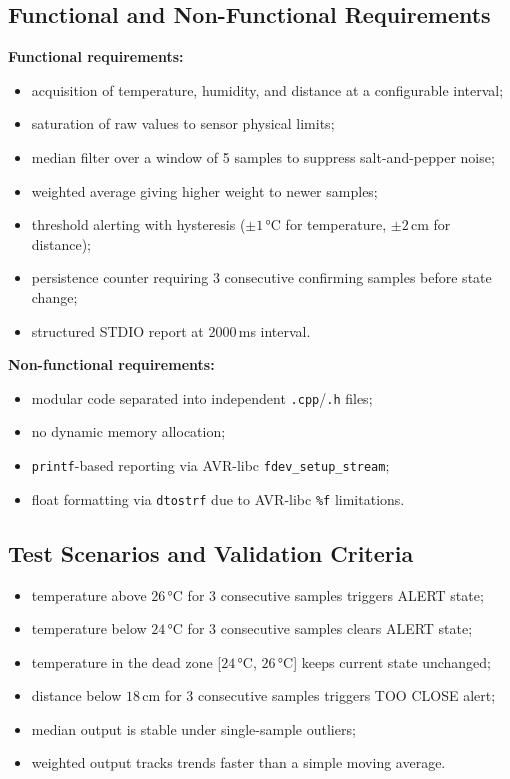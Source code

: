 \documentclass[12pt,a4paper]{article}
\begin{document}
\subsection{Functional and Non-Functional Requirements}

\textbf{Functional requirements:}
\begin{itemize}
    \item acquisition of temperature, humidity, and distance at a configurable interval;
    \item saturation of raw values to sensor physical limits;
    \item median filter over a window of 5 samples to suppress salt-and-pepper noise;
    \item weighted average giving higher weight to newer samples;
    \item threshold alerting with hysteresis ($\pm1$\,°C for temperature, $\pm2$\,cm for distance);
    \item persistence counter requiring 3 consecutive confirming samples before state change;
    \item structured STDIO report at 2000\,ms interval.
\end{itemize}

\textbf{Non-functional requirements:}
\begin{itemize}
    \item modular code separated into independent \texttt{.cpp}/\texttt{.h} files;
    \item no dynamic memory allocation;
    \item \texttt{printf}-based reporting via AVR-libc \texttt{fdev\_setup\_stream};
    \item float formatting via \texttt{dtostrf} due to AVR-libc \texttt{\%f} limitations.
\end{itemize}

\subsection{Test Scenarios and Validation Criteria}
\begin{itemize}
    \item temperature above $26$\,°C for 3 consecutive samples triggers ALERT state;
    \item temperature below $24$\,°C for 3 consecutive samples clears ALERT state;
    \item temperature in the dead zone [$24$\,°C, $26$\,°C] keeps current state unchanged;
    \item distance below $18$\,cm for 3 consecutive samples triggers TOO CLOSE alert;
    \item median output is stable under single-sample outliers;
    \item weighted output tracks trends faster than a simple moving average.
\end{itemize}
\end{document}
